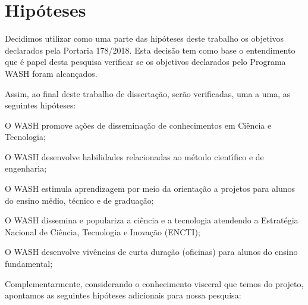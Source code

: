 \documentclass[
12pt,		%
openright,	%
twoside,  %
a4paper,			%
chapter=TITLE,		%
english,			%
french,				%
spanish,			%
brazil				%
]{USPSC-classe/USPSC}
\begin{document}
\section[Hip\'oteses]{Hip\'oteses}\label{Hip\'oteses}
Decidimos utilizar como uma parte das hip\'oteses deste trabalho os objetivos declarados pela Portaria 178/2018. Esta decis\~ao tem como base o entendimento que \'e papel desta pesquisa verificar se os objetivos declarados pelo Programa WASH foram alcan\c{c}ados.









Assim, ao final deste trabalho de disserta\c{c}\~ao, ser\~ao verificadas, uma a uma, as seguintes hip\'oteses:










\begin{alineas}
\item O WASH promove a\c{c}\~oes de dissemina\c{c}\~ao de conhecimentos em Ci\^encia e Tecnologia;
\item O WASH desenvolve habilidades relacionadas ao m\'etodo cient\'{\i}fico e de engenharia;
\item O WASH estimula aprendizagem por meio da orienta\c{c}\~ao a projetos para alunos do ensino m\'edio, t\'ecnico e de gradua\c{c}\~ao;
\item O WASH dissemina e populariza a ci\^encia e a tecnologia atendendo a Estrat\'egia Nacional de Ci\^encia, Tecnologia e Inova\c{c}\~ao (ENCTI);
\item O WASH desenvolve viv\^encias de curta dura\c{c}\~ao (oficinas) para alunos do ensino fundamental;
\end{alineas}

Complementarmente, considerando o conhecimento visceral que temos do projeto, apontamos as seguintes hip\'oteses adicionais para nossa pesquisa:
\end{document}
